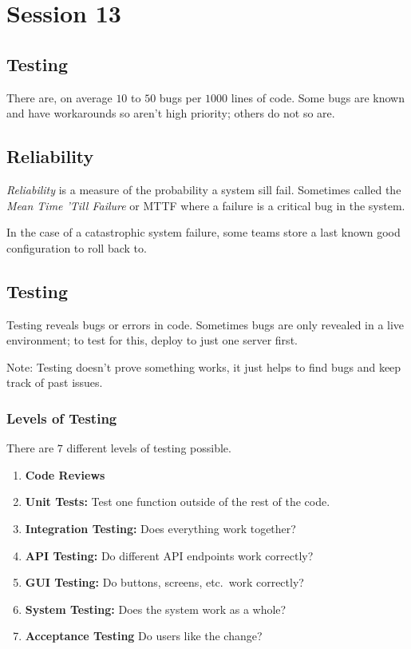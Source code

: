 \section{Session 13}\label{sec:session_13}

\subsection{Testing}\label{sub:testing}

There are, on average \(10\) to \(50\) bugs per \(1000\) lines of code.
Some bugs are known and have workarounds so aren't high priority; others do not so are.

\subsection{Reliability}\label{ssub:reliability}

\emph{Reliability} is a measure of the probability a system sill fail.
Sometimes called the \emph{Mean Time 'Till Failure} or MTTF where a failure is a critical bug in the system.

In the case of a catastrophic system failure, some teams store a last known good configuration to roll back to.

\subsection{Testing}\label{ssub:testing}

Testing reveals bugs or errors in code.
Sometimes bugs are only revealed in a live environment; to test for this, deploy to just one server first.

\begin{note}
	Note: Testing doesn't prove something works, it just helps to find bugs and keep track of past issues.
\end{note}

\subsubsection{Levels of Testing}\label{ssub:levels_of_testing}

There are \(7\) different levels of testing possible.

\begin{enumerate}
	\item \textbf{Code Reviews}
	\item \textbf{Unit Tests:} Test one function outside of the rest of the code.
	\item \textbf{Integration Testing:} Does everything work together?
	\item \textbf{API Testing:} Do different API endpoints work correctly?
	\item \textbf{GUI Testing:} Do buttons, screens, etc.\ work correctly?
	\item \textbf{System Testing:} Does the system work as a whole?
	\item \textbf{Acceptance Testing} Do users like the change?
\end{enumerate}

